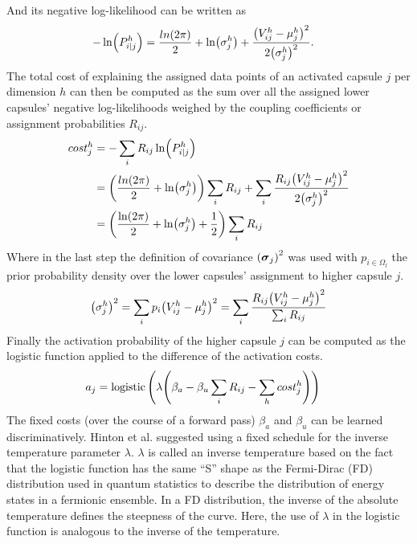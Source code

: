 And its negative log-likelihood can be written as
\begin{align}
    -\ln(P_{i|j}^h) &= \frac{ln(2\pi)}{2}+\ln(\sigma_j^h)+\frac{\qty(V_{ij}^h-\mu_j^h)^2}{2\qty(\sigma_j^h)^2}.
\end{align}
The total cost of explaining the assigned data points of an activated capsule $j$ per dimension $h$ can then be computed as the sum over all the assigned lower capsules' negative log-likelihoods weighed by the coupling coefficients or assignment probabilities $R_{ij}$.
\begin{align}
    cost_j^h &= - \sum_i R_{ij} \ln(P_{i|j}^h)\\
    &= \qty(\frac{ln(2\pi)}{2}+\ln(\sigma_j^h))\sum_i R_{ij}+\sum_i\frac{R_{ij}\qty(V_{ij}^h-\mu_j^h)^2}{2\qty(\sigma_j^h)^2}\\
    &= \qty(\frac{\ln(2\pi)}{2}+\ln(\sigma_j^h) + \frac{1}{2})\sum_i R_{ij}
\end{align}
Where in the last step the definition of covariance $\qty(\vb*{\sigma}_j)^2$ was used with $p_{i\in\Omega_l}$ the prior probability density over the lower capsules' assignment to higher capsule $j$.
\begin{align}
    \qty(\sigma_j^h)^2 = \sum_i p_i\qty(V_{ij}^h-\mu_j^h)^2 = \sum_i\frac{R_{ij} \qty(V_{ij}^h-\mu_j^h)^2}{\sum_i R_{ij}}
\end{align}
Finally the activation probability of the higher capsule $j$ can be computed as the logistic function applied to the difference of the activation costs.
\begin{align}
    a_j &= \operatorname{logistic}\qty(\lambda\qty(\beta_a-\beta_u\sum_i R_{ij}-\sum_h cost_j^h))
\end{align}
The fixed costs (over the course of a forward pass) $\beta_a$ and $\beta_u$ can be learned discriminatively. Hinton et al. suggested using a fixed schedule for the inverse temperature parameter $\lambda$. $\lambda$ is called an inverse temperature based on the fact that the logistic function\label{foot:fermi-dirac} has the same \enquote{S} shape as the Fermi-Dirac (FD) distribution used in quantum statistics to describe the distribution of energy states in a fermionic ensemble. In a FD distribution, the inverse of the absolute temperature defines the steepness of the curve. Here, the use of $\lambda$ in the logistic function is analogous to the inverse of the temperature.
